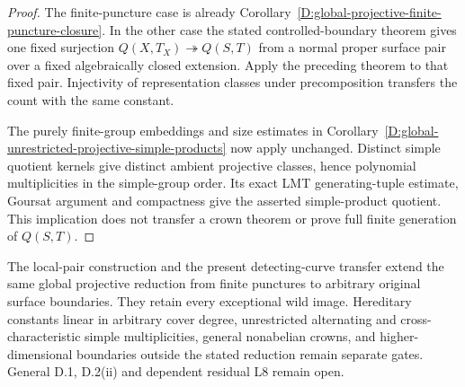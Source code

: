 \begin{proof}
The finite-puncture case is already
Corollary~\ref{D:global-projective-finite-puncture-closure}.
In the other case the stated controlled-boundary theorem gives
one fixed surjection $Q(X,T_X)\twoheadrightarrow Q(S,T)$ from
a normal proper surface pair over a fixed algebraically closed
extension. Apply the preceding theorem to that fixed pair.
Injectivity of representation classes under precomposition
transfers the count with the same constant.

The purely finite-group embeddings and size estimates in
Corollary~\ref{D:global-unrestricted-projective-simple-products}
now apply unchanged. Distinct simple quotient kernels give
distinct ambient projective classes, hence polynomial
multiplicities in the simple-group order. Its exact LMT
generating-tuple estimate, Goursat argument and compactness
give the asserted simple-product quotient. This implication
does not transfer a crown theorem or prove full finite
generation of $Q(S,T)$.
\end{proof}

\begin{remark}
The local-pair construction and the present detecting-curve
transfer extend the same global projective reduction from
finite punctures to arbitrary original surface boundaries.
They retain every exceptional wild image. Hereditary constants
linear in arbitrary cover degree, unrestricted alternating and
cross-characteristic simple multiplicities, general nonabelian
crowns, and higher-dimensional boundaries outside the stated
reduction remain separate gates. General D.1, D.2(ii) and
dependent residual L8 remain open.
\end{remark}
